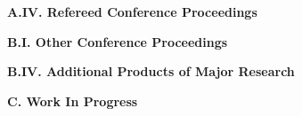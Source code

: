 \documentclass[ucsd,cs,11pt]{ucletter}
\begin{document}
\textbf{A.IV. Refereed Conference Proceedings}
\nocite{*}
\vspace{10pt}
\printbibliography[heading=none]%

\textbf{B.I. Other Conference Proceedings}
\nocite{*}
\vspace{10pt}
\printbibliography[heading=none]%

\textbf{B.IV. Additional Products of Major Research}
\nocite{*}
\vspace{10pt}
\printbibliography[heading=none]%

\textbf{C. Work In Progress}
\nocite{*}
\vspace{10pt}
\printbibliography[heading=none]%
\end{document}
